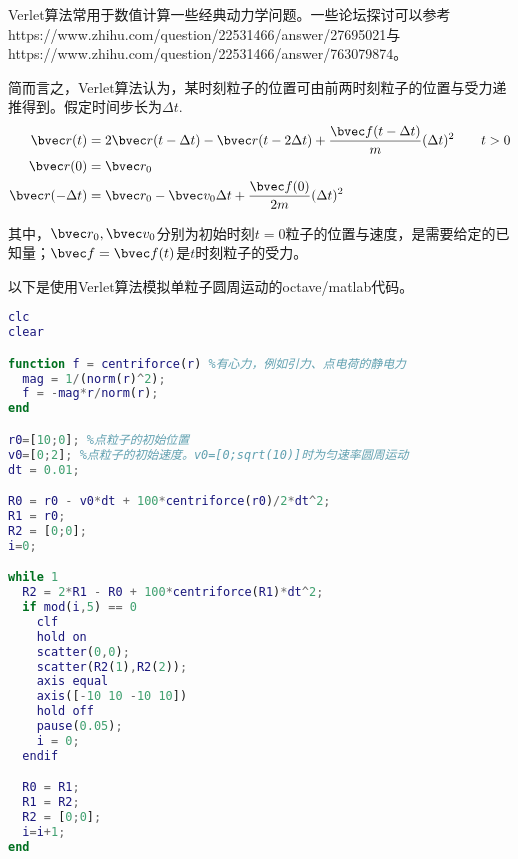 

\begin{issues}
\issueNeedCite
\end{issues}

Verlet算法常用于数值计算一些经典动力学问题。一些论坛探讨可以参考https://www.zhihu.com/question/22531466/answer/27695021与https://www.zhihu.com/question/22531466/answer/763079874。

简而言之，Verlet算法认为，某时刻粒子的位置可由前两时刻粒子的位置与受力递推得到。假定时间步长为$\Delta t$.
\begin{equation}
\begin{aligned}
\bvec r (t) &= 2\bvec r(t-\Delta t) - \bvec r(t-2\Delta t) + \frac{\bvec f(t-\Delta t)}{m}(\Delta t)^2 \qquad t>0\\
\bvec r (0) &= \bvec r_0\\
\bvec r (- \Delta t) &= \bvec r_0 - \bvec v_0 \Delta t + \frac{\bvec f(0)}{2m}(\Delta t)^2\\
\end{aligned}
\end{equation}

其中，$\bvec r_0, \bvec v_0$分别为初始时刻$t=0$粒子的位置与速度，是需要给定的已知量；$\bvec f = \bvec f(t)$是$t$时刻粒子的受力。

以下是使用Verlet算法模拟单粒子圆周运动的octave/matlab代码。
\begin{lstlisting}[language=matlab]
clc
clear

function f = centriforce(r) %有心力，例如引力、点电荷的静电力
  mag = 1/(norm(r)^2);
  f = -mag*r/norm(r);
end

r0=[10;0]; %点粒子的初始位置
v0=[0;2]; %点粒子的初始速度。v0=[0;sqrt(10)]时为匀速率圆周运动
dt = 0.01;

R0 = r0 - v0*dt + 100*centriforce(r0)/2*dt^2;
R1 = r0;
R2 = [0;0];
i=0;

while 1
  R2 = 2*R1 - R0 + 100*centriforce(R1)*dt^2;
  if mod(i,5) == 0
    clf
    hold on
    scatter(0,0);
    scatter(R2(1),R2(2));
    axis equal
    axis([-10 10 -10 10])
    hold off
    pause(0.05);
    i = 0;
  endif

  R0 = R1;
  R1 = R2;
  R2 = [0;0];
  i=i+1;
end

\end{lstlisting}

